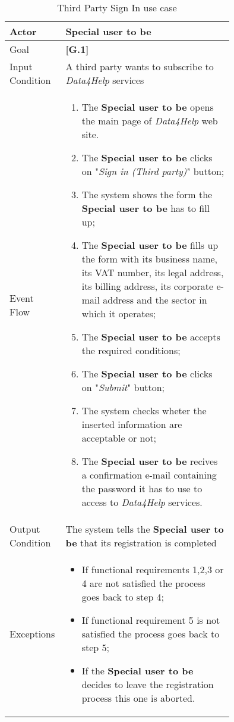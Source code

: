 \begin{center}
\begin{table}
\begin{tabular}{ | l | p{0.75\linewidth} | }
  \hline
    Actor & \textbf{Special user to be} \\ \hline
    Goal & \textbf{[G.1]} \\ \hline
    Input Condition & A third party wants to subscribe to  \textit{Data4Help} services \\ \hline
    Event Flow & \begin{minipage}[t]{0.7\textwidth}
      \begin{enumerate}
        \item The \textbf{Special user to be} opens the main page of \textit{Data4Help} web site.
        \item The \textbf{Special user to be} clicks on "\textit{Sign in (Third party)}" button;
        \item The system shows the form the \textbf{Special user to be} has to fill up;
        \item The \textbf{Special user to be} fills up the form with its business name, its VAT number, its legal address, its billing address, its corporate e-mail address and the sector in which it operates;
        \item The \textbf{Special user to be} accepts the required conditions;
        \item The \textbf{Special user to be} clicks on "\textit{Submit}" button;
        \item The system checks wheter the inserted information are acceptable or not;
        \item The \textbf{Special user to be} recives a confirmation e-mail containing the password it has to use to access to \textit{Data4Help} services.
      \end{enumerate}
    \smallskip
  \end{minipage} \\ \hline
  Output Condition & The system tells the \textbf{Special user to be} that its registration is completed \\ \hline
  Exceptions & \begin{minipage}[t]{0.7\textwidth}
    \begin{itemize}
      \smallskip
      \item If functional requirements 1,2,3 or 4 are not satisfied the process goes back to step 4;
      \item If functional requirement 5 is not satisfied the process goes back to step 5;
      \item If the \textbf{Special user to be} decides to leave the registration process this one is aborted.
    \end{itemize}
    \smallskip
  \end{minipage}  \\ \hline
\end{tabular}
\caption{Third Party Sign In use case}
\label{table:thirdPartySignInTable}
\end{table}
\end{center}
